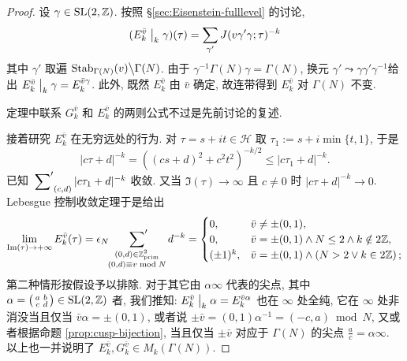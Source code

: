 \begin{proof}
	设 $\gamma \in \operatorname{SL}(2,\mathbb{Z})$. 按照 \S\ref{sec:Eisenstein-fulllevel} 的讨论,
	\[ (E^{\bar{v}}_k \;\big|_{k} \; \gamma) (\tau) = \sum_{\gamma'} J(v\gamma'\gamma; \tau)^{-k} \]
	其中 $\gamma'$ 取遍 $\operatorname{Stab}_{\Gamma(N)}(v) \big\backslash \Gamma(N)$. 由于 $\gamma^{-1}\Gamma(N)\gamma = \Gamma(N)$, 换元 $\gamma' \leadsto \gamma \gamma' \gamma^{-1}$给出 $E^{\bar{v}}_k \;\big|_{k} \; \gamma = E^{\bar{v}\gamma}_k$. 此外, 既然 $E^{\bar{v}}_k$ 由 $\bar{v}$ 确定, 故连带得到 $E^{\bar{v}}_k$ 对 $\Gamma(N)$ 不变.
	
	定理中联系 $G^{\bar{v}}_k$ 和 $E^{\bar{v}}_k$ 的两则公式不过是先前讨论的复述.
	
	接着研究 $E^{\bar{v}}_k$ 在无穷远处的行为. 对 $\tau = s + it \in \mathcal{H}$ 取 $\tau_1 := s + i\min\{t,1\}$, 于是
	\[ |c\tau + d|^{-k} = \left((cs + d)^2 + c^2 t^2\right)^{-k/2} \leq |c\tau_1 + d|^{-k}. \]
	已知 $\sideset{}{'}\sum_{(c,d)} |c\tau_1 + d|^{-k}$ 收敛. 又当 $\Im(\tau) \to \infty$ 且 $c \neq 0$ 时 $|c\tau + d|^{-k} \to 0$. Lebesgue 控制收敛定理于是给出
	\[ \lim_{\operatorname{Im}(\tau) \to +\infty} E^{\bar{v}}_k(\tau) = \epsilon_N \sideset{}{'}\sum_{\substack{ (0,d) \in \mathbb{Z}^2_{\text{prim}} \\ (0,d) \equiv v \bmod N }} d^{-k}
	= \begin{cases}
		0, & \bar{v} \neq \pm (0,1), \\
		0, & \bar{v} = \pm(0,1) \wedge N \leq 2 \wedge k \notin 2\mathbb{Z}, \\
		(\pm 1)^k, & \bar{v} = \pm(0,1) \wedge \left( N > 2 \vee k \in 2\mathbb{Z} \right);
	\end{cases} \]
	第二种情形按假设予以排除. 对于其它由 $\alpha\infty$ 代表的尖点, 其中 $\alpha = \bigl(\begin{smallmatrix} a & b \\ c & d \end{smallmatrix}\bigr) \in \operatorname{SL}(2,\mathbb{Z})$ 者, 我们推知: $E^{\bar{v}}_k \;\big|_{k} \; \alpha = E^{\bar{v}\alpha}_k$ 也在 $\infty$ 处全纯, 它在 $\infty$ 处非消没当且仅当 $\bar{v}\alpha = \pm(0,1)$, 或者说 $\pm\bar{v} = (0,1) \alpha^{-1} = (-c, a) \bmod N$, 又或者根据命题 \ref{prop:cusp-bijection}, 当且仅当 $\pm\bar{v}$ 对应于 $\Gamma(N)$ 的尖点 $\frac{a}{c} = \alpha\infty$. 以上也一并说明了 $E^{\bar{v}}_k, G^{\bar{v}}_k \in M_k(\Gamma(N))$.


\end{proof}
